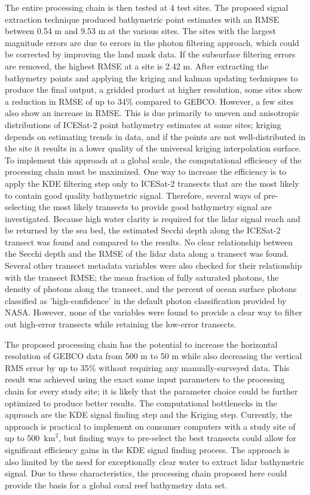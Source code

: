 The entire processing chain is then tested at 4 test sites. The proposed signal extraction technique produced bathymetric point estimates with an RMSE between 0.54 m and 9.53 m at the various sites. The sites with the largest magnitude errors are due to errors in the photon filtering approach, which could be corrected by improving the land mask data. If the subsurface filtering errors are removed, the highest RMSE at a site is 2.42 m. After extracting the bathymetry points and applying the kriging and kalman updating techniques to produce the final output, a gridded product at higher resolution, some sites show a reduction in RMSE of up to 34\% compared to GEBCO. However, a few sites also show an increase in RMSE. This is due primarily to uneven and anisotropic distributions of ICESat-2 point bathymetry estimates at some sites; kriging depends on estimating trends in data, and if the points are not well-distributed in the site it results in a lower quality of the universal kriging interpolation surface.
\vskip 0.1in
To implement this approach at a global scale, the computational efficiency of the processing chain must be maximized. One way to increase the efficiency is to apply the KDE filtering step only to ICESat-2 transects that are the most likely to contain good quality bathymetric signal. Therefore, several ways of pre-selecting the most likely transects to provide good bathymetry signal are investigated. Because high water clarity is required for the lidar signal reach and be returned by the sea bed, the estimated Secchi depth along the ICESat-2 transect was found and compared to the results. No clear relationship between the Secchi depth and the RMSE of the lidar data along a transect was found. Several other transect metadata variables were also checked for their relationship with the transect RMSE; the mean fraction of fully saturated photons, the density of photons along the transect, and the percent of ocean surface photons classified as 'high-confidence' in the default photon classification provided by NASA. However, none of the variables were found to provide a clear way to filter out high-error transects while retaining the low-error transects.
\vskip 0.1in

The proposed processing chain has the potential to increase the horizontal resolution of GEBCO data from 500 m to 50 m while also decreasing the vertical RMS error by up to 35\% without requiring any manually-surveyed data. This result was achieved using the exact same input parameters to the processing chain for every study site; it is likely that the parameter choice could be further optimized to produce better results. The computational bottlenecks in the approach are the KDE signal finding step and the Kriging step. Currently, the approach is practical to implement on consumer computers with a study site of up to 500~$\text{km}^2$, but finding ways to pre-select the best transects could allow for significant efficiency gains in the KDE signal finding process. The approach is also limited by the need for exceptionally clear water to extract lidar bathymetric signal. Due to these characteristics, the processing chain proposed here could provide the basis for a global coral reef bathymetry data set.
